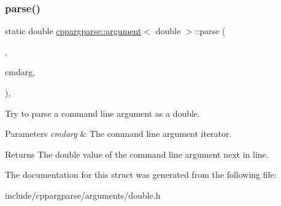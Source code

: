 \subsubsection{\texorpdfstring{parse()}{parse()}}
{\footnotesize\ttfamily static double \hyperlink{structcppargparse_1_1argument}{cppargparse\+::argument}$<$ double $>$\+::parse (\begin{DoxyParamCaption}\item[{const types\+::\+Command\+Line\+\_\+t \&}]{,  }\item[{const types\+::\+Command\+Line\+Argument\+\_\+t \&}]{cmdarg,  }\item[{const types\+::\+Command\+Line\+Arguments\+Map\+\_\+t \&}]{ }\end{DoxyParamCaption})\hspace{0.3cm}{\ttfamily [inline]}, {\ttfamily [static]}}



Try to parse a command line argument as a double. 


\begin{DoxyParams}{Parameters}
{\em cmdarg} & The command line argument iterator.\\
\hline
\end{DoxyParams}
\begin{DoxyReturn}{Returns}
The double value of the command line argument next in line. 
\end{DoxyReturn}


The documentation for this struct was generated from the following file\+:\begin{DoxyCompactItemize}
\item 
include/cppargparse/arguments/double.\+h\end{DoxyCompactItemize}
